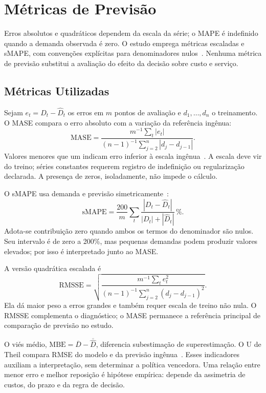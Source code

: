 \section{Métricas de Previsão}

Erros absolutos e quadráticos dependem da escala da série; o MAPE é indefinido quando a demanda observada é zero. O estudo emprega métricas escaladas e sMAPE, com convenções explícitas para denominadores nulos~\citep{Hyndman2006MASE,Makridakis2020M4Competition}. Nenhuma métrica de previsão substitui a avaliação do efeito da decisão sobre custo e serviço.

\subsection{Métricas Utilizadas}

Sejam $e_t=D_t-\hat D_t$ os erros em $m$ pontos de avaliação e $d_1,\ldots,d_n$ o treinamento. O MASE compara o erro absoluto com a variação da referência ingênua:
\begin{equation}
\mathrm{MASE}=\frac{m^{-1}\sum_t|e_t|}{(n-1)^{-1}\sum_{j=2}^{n}|d_j-d_{j-1}|}.
\label{eq:mase}
\end{equation}
Valores menores que um indicam erro inferior à escala ingênua~\citep{Hyndman2006MASE}. A escala deve vir do treino; séries constantes requerem registro de indefinição ou regularização declarada. A presença de zeros, isoladamente, não impede o cálculo.

O sMAPE usa demanda e previsão simetricamente~\citep{Makridakis1993SMAPE}:
\begin{equation}
\mathrm{sMAPE}=\frac{200}{m}\sum_t\frac{|D_t-\hat D_t|}{|D_t|+|\hat D_t|}\,\%.
\label{eq:smape}
\end{equation}
Adota-se contribuição zero quando ambos os termos do denominador são nulos. Seu intervalo é de zero a 200\%, mas pequenas demandas podem produzir valores elevados; por isso é interpretado junto ao MASE.

A versão quadrática escalada é
\begin{equation}
\mathrm{RMSSE}=\sqrt{\frac{m^{-1}\sum_te_t^2}{(n-1)^{-1}\sum_{j=2}^{n}(d_j-d_{j-1})^2}}.
\label{eq:rmsse}
\end{equation}
Ela dá maior peso a erros grandes e também requer escala de treino não nula. O RMSSE complementa o diagnóstico; o MASE permanece a referência principal de comparação de previsão no estudo.

O viés médio, $\mathrm{MBE}=\overline D-\overline{\hat D}$, diferencia subestimação de superestimação. O U de Theil compara RMSE do modelo e da previsão ingênua~\citep{Theil1966AppliedEconometrics}. Esses indicadores auxiliam a interpretação, sem determinar a política vencedora. Uma relação entre menor erro e melhor reposição é hipótese empírica: depende da assimetria de custos, do prazo e da regra de decisão.

